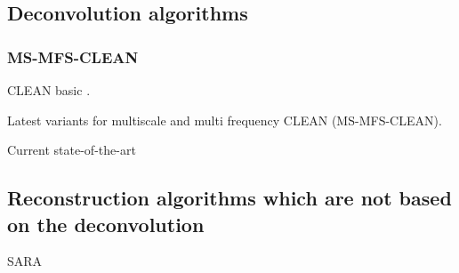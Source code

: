 \subsection{Deconvolution algorithms}
\subsubsection{MS-MFS-CLEAN}
CLEAN basic \cite{hogbom1974aperture}.

Latest variants for multiscale and multi frequency CLEAN (MS-MFS-CLEAN)\cite{rau2011multi}.

Current state-of-the-art

\subsection{Reconstruction algorithms which are not based on the deconvolution}
SARA










